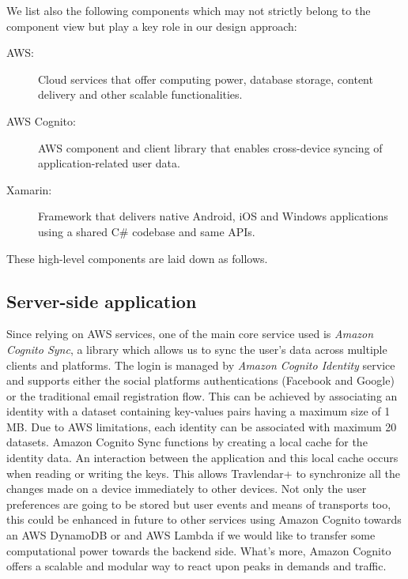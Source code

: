 We list also the following components which may not strictly belong to the component view but play a key role in our design approach:
\begin{description}
	\item[AWS:] Cloud services that offer computing power, database storage, content delivery and other scalable functionalities.
	\item [AWS Cognito:] AWS component and client library that enables cross-device syncing of application-related user data.
	\item[Xamarin:] Framework that delivers native Android, iOS and Windows applications using a shared C\# codebase and same APIs.
\end{description}

These high-level components are laid down as follows.

\subsection*{Server-side application}
Since relying on AWS services, one of the main core service used is \textit{Amazon Cognito Sync}, a library which allows us to sync the user's data across multiple clients and platforms.
The login is managed by \textit{Amazon Cognito Identity} service and supports either the social platforms authentications (Facebook and Google) or the traditional email registration flow. This can be achieved by associating an identity with a dataset containing key-values pairs having a maximum size of 1 MB. Due to AWS limitations, each identity can be associated with maximum 20 datasets.
Amazon Cognito Sync functions by creating a local cache for the identity data. An interaction between the application and this local cache occurs when reading or writing the keys. 
This allows Travlendar+ to synchronize all the changes made on a device immediately to other devices.
Not only the user preferences are going to be stored but user events and means of transports too, this could be enhanced in future to other services using Amazon Cognito towards an AWS DynamoDB or and AWS Lambda if we would like to transfer some computational power towards the backend side. What's more, Amazon Cognito offers a scalable and modular way to react upon peaks in demands and traffic.

